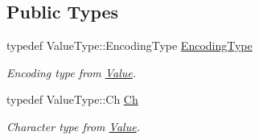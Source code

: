 \subsection*{Public Types}
\begin{DoxyCompactItemize}
\item 
\mbox{\label{classGenericPointer_a4b802da797a7a0b615fd9611cedb7c3b}} 
typedef Value\+Type\+::\+Encoding\+Type \hyperlink{classGenericPointer_a4b802da797a7a0b615fd9611cedb7c3b}{Encoding\+Type}
\begin{DoxyCompactList}\small\item\em Encoding type from \hyperlink{classValue}{Value}. \end{DoxyCompactList}\item 
\mbox{\label{classGenericPointer_ab292356c11b4015c98d21b966b11f285}} 
typedef Value\+Type\+::\+Ch \hyperlink{classGenericPointer_ab292356c11b4015c98d21b966b11f285}{Ch}
\begin{DoxyCompactList}\small\item\em Character type from \hyperlink{classValue}{Value}. \end{DoxyCompactList}\end{DoxyCompactItemize}
